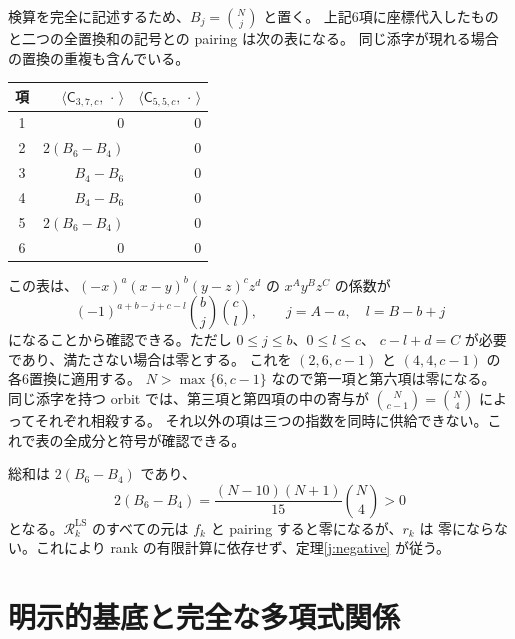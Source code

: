 \documentclass[12pt]{amsart}
\theoremstyle{definition}
\theoremstyle{remark}
\numberwithin{equation}{section}
\newcommand{\RR}{\mathcal R^{\mathrm{LS}}}
\newcommand{\fC}[3]{\mathsf C_{#1,#2,#3}}
\numberwithin{equation}{section}
\begin{document}
検算を完全に記述するため、$B_j=\binom Nj$ と置く。
上記6項に座標代入したものと二つの全置換和の記号との pairing は次の表になる。
同じ添字が現れる場合の置換の重複も含んでいる。
\begin{center}
\begin{tabular}{crr}\toprule
項 & $\langle\fC{3}{7}{c},\,\cdot\,\rangle$
   & $\langle\fC{5}{5}{c},\,\cdot\,\rangle$\\\midrule
1 & $0$ & $0$\\
2 & $2(B_6-B_4)$ & $0$\\
3 & $B_4-B_6$ & $0$\\
4 & $B_4-B_6$ & $0$\\
5 & $2(B_6-B_4)$ & $0$\\
6 & $0$ & $0$\\\bottomrule
\end{tabular}\end{center}
この表は、$(-x)^a(x-y)^b(y-z)^cz^d$ の $x^Ay^Bz^C$ の係数が
\begin{equation}\label{j:binomcoeff}
 (-1)^{a+b-j+c-l}\binom bj\binom cl,
 \qquad j=A-a,\quad l=B-b+j
\end{equation}
になることから確認できる。ただし $0\le j\le b$、$0\le l\le c$、
$c-l+d=C$ が必要であり、満たさない場合は零とする。
これを $(2,6,c-1)$ と $(4,4,c-1)$ の各6置換に適用する。
$N>\max\{6,c-1\}$ なので第一項と第六項は零になる。
同じ添字を持つ orbit では、第三項と第四項の中の寄与が
$\binom N{c-1}=\binom N4$ によってそれぞれ相殺する。
それ以外の項は三つの指数を同時に供給できない。これで表の全成分と符号が確認できる。

総和は $2(B_6-B_4)$ であり、
\[
 2(B_6-B_4)=\frac{(N-10)(N+1)}{15}\binom N4>0
\]
となる。$\RR_k$ のすべての元は $f_k$ と pairing すると零になるが、$r_k$ は
零にならない。これにより rank の有限計算に依存せず、定理\ref{j:negative} が従う。

\section{明示的基底と完全な多項式関係}
\end{document}
